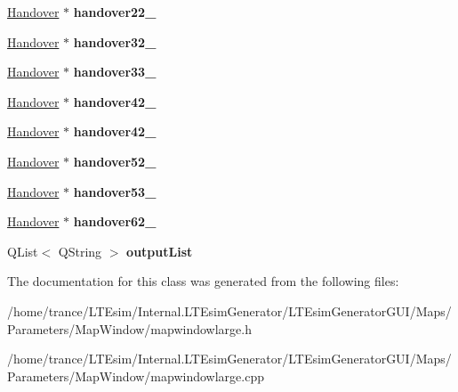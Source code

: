 \begin{DoxyCompactItemize}
\item 
\hyperlink{class_handover}{Handover} $\ast$ {\bfseries handover22\+\_}\hypertarget{class_map_window_large_a5259bc7d51392c6c3e94ab6ecd96cc8e}{}\label{class_map_window_large_a5259bc7d51392c6c3e94ab6ecd96cc8e}

\item 
\hyperlink{class_handover}{Handover} $\ast$ {\bfseries handover32\+\_}\hypertarget{class_map_window_large_aad2eaca7ab1afd87585ed613260276d2}{}\label{class_map_window_large_aad2eaca7ab1afd87585ed613260276d2}

\item 
\hyperlink{class_handover}{Handover} $\ast$ {\bfseries handover33\+\_}\hypertarget{class_map_window_large_a0117d346f26b9bd4cddf13c9a4b2d82f}{}\label{class_map_window_large_a0117d346f26b9bd4cddf13c9a4b2d82f}

\item 
\hyperlink{class_handover}{Handover} $\ast$ {\bfseries handover42\+\_}\hypertarget{class_map_window_large_aac5f2658b081b1304b203ff8c68f5cb2}{}\label{class_map_window_large_aac5f2658b081b1304b203ff8c68f5cb2}

\item 
\hyperlink{class_handover}{Handover} $\ast$ {\bfseries handover42\+\_}\hypertarget{class_map_window_large_a872c648cec572749351f06da2bba0748}{}\label{class_map_window_large_a872c648cec572749351f06da2bba0748}

\item 
\hyperlink{class_handover}{Handover} $\ast$ {\bfseries handover52\+\_}\hypertarget{class_map_window_large_a4b6cad059c7f79749265ae1f5c5a3a1d}{}\label{class_map_window_large_a4b6cad059c7f79749265ae1f5c5a3a1d}

\item 
\hyperlink{class_handover}{Handover} $\ast$ {\bfseries handover53\+\_}\hypertarget{class_map_window_large_a60dab031f2f95a6b068498e653b2132d}{}\label{class_map_window_large_a60dab031f2f95a6b068498e653b2132d}

\item 
\hyperlink{class_handover}{Handover} $\ast$ {\bfseries handover62\+\_}\hypertarget{class_map_window_large_abbb76609a6fef7cd2fa19f8fdd9eb7bc}{}\label{class_map_window_large_abbb76609a6fef7cd2fa19f8fdd9eb7bc}

\item 
Q\+List$<$ Q\+String $>$ {\bfseries output\+List}\hypertarget{class_map_window_large_a9a78162b6c49eee5b75a782916b9965e}{}\label{class_map_window_large_a9a78162b6c49eee5b75a782916b9965e}

\end{DoxyCompactItemize}


The documentation for this class was generated from the following files\+:\begin{DoxyCompactItemize}
\item 
/home/trance/\+L\+T\+Esim/\+Internal.\+L\+T\+Esim\+Generator/\+L\+T\+Esim\+Generator\+G\+U\+I/\+Maps/\+Parameters/\+Map\+Window/mapwindowlarge.\+h\item 
/home/trance/\+L\+T\+Esim/\+Internal.\+L\+T\+Esim\+Generator/\+L\+T\+Esim\+Generator\+G\+U\+I/\+Maps/\+Parameters/\+Map\+Window/mapwindowlarge.\+cpp\end{DoxyCompactItemize}
